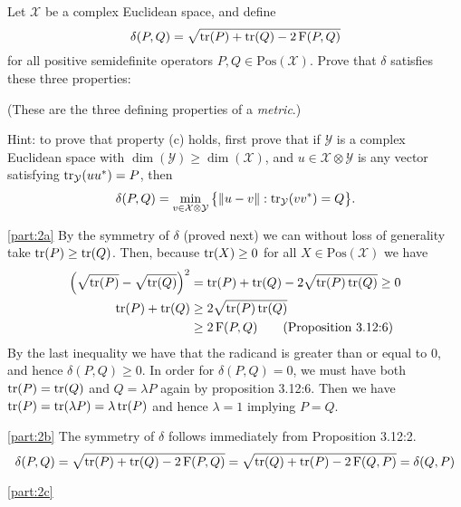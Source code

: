 \documentclass[boxes,pages,color=SeaGreen]{homework}
\newcommand{\X}{\mathcal{X}}
\newcommand{\Y}{\mathcal{Y}}
\newcommand{\Fid}{\operatorname{F}}
\newcommand{\Pos}{\mathrm{Pos}}
\begin{document}
\begin{problem}
Let $\X$ be a complex Euclidean space, and define
\[
    \delta(P,Q) = \sqrt{\tr(P) + \tr(Q) - 2 \Fid(P,Q)}
\]
for all positive semidefinite operators $P,Q\in\Pos(\X)$.
Prove that $\delta$ satisfies these three properties:
(These are the three defining properties of a \emph{metric}.)

Hint: to prove that property (c) holds, first prove that if
$\Y$ is a complex Euclidean space with $\dim(\Y)\geq\dim(\X)$,
and $u\in\X\otimes\Y$ is any vector satisfying $\tr_{\Y}(u u^{\ast}) = P$,
then
\[
    \delta(P,Q) = \min_{v\in\X\otimes\Y}\qty\big{\norm{u - v} : \tr_{\Y}(v v^*) = Q}.
\]
\end{problem}

\begin{solution}
    \ref{part:2a}
    By the symmetry of $\delta$ (proved next) we can without loss of generality take $\tr(P)\geq \tr(Q)$.
    Then, because $\tr(X) \geq 0$ for all $X\in\Pos(\X)$ we have
    \begin{align*}
        \qty(\sqrt{\tr(P)} - \sqrt{\tr(Q)})^2 & = \tr(P) + \tr(Q) - 2\sqrt{\tr(P)\tr(Q)} \geq 0 \\
        \tr(P) + \tr(Q)                       & \geq 2\sqrt{\tr(P)\tr(Q)}                       \\
                                              & \geq 2\Fid(P, Q) \tag{Proposition 3.12:6}
    \end{align*}
    By the last inequality we have that the radicand is greater than or equal to 0, and hence $\delta(P, Q) \geq 0$.
    In order for $\delta(P, Q) = 0$, we must have both $\tr(P) = \tr(Q)$ and $Q = \lambda P$ again by proposition 3.12:6.
    Then we have $\tr(P) = \tr(\lambda P) = \lambda \tr(P)$ and hence $\lambda = 1$ implying $P = Q$.

    \ref{part:2b}
    The symmetry of $\delta$ follows immediately from Proposition 3.12:2.
    \begin{equation*}
        \delta(P, Q) = \sqrt{\tr(P) + \tr(Q) - 2\Fid(P, Q)} = \sqrt{\tr(Q) + \tr(P) - 2\Fid(Q, P)} = \delta(Q, P)
    \end{equation*}

    \ref{part:2c}

\end{solution}
\end{document}
